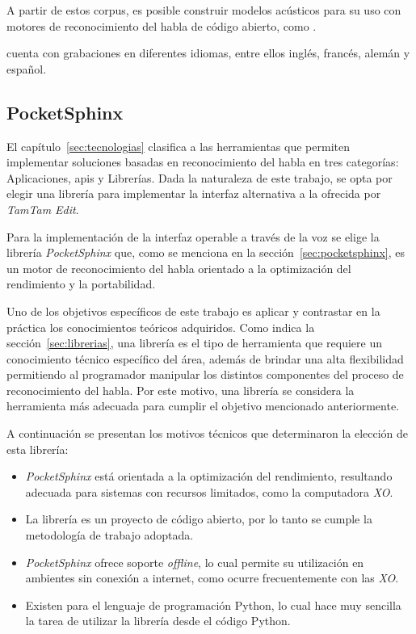 A partir de estos corpus, es posible construir modelos ac\'usticos para su uso con motores de 
reconocimiento del habla de c\'odigo abierto, como .

 cuenta con grabaciones en diferentes idiomas, entre ellos ingl\'es, franc\'es, 
alem\'an y espa\~nol.


\subsection{PocketSphinx}

El cap\'itulo~\ref{sec:tecnologias} clasifica a las herramientas que permiten implementar soluciones
basadas en reconocimiento del habla en tres categor\'ias: Aplicaciones, \gls{api}s y Librer\'ias. 
Dada la naturaleza de este trabajo, se opta por elegir una librer\'ia para implementar la interfaz
alternativa a la ofrecida por \emph{TamTam Edit}.

Para la implementaci\'on de la interfaz operable a trav\'es de la voz se elige la librer\'ia 
\emph{PocketSphinx} que, como se menciona en la secci\'on~\ref{sec:pocketsphinx}, es un motor de 
reconocimiento del habla orientado a la optimizaci\'on del rendimiento y la portabilidad.

Uno de los objetivos espec\'ificos de este trabajo es aplicar y contrastar en la pr\'actica
los conocimientos te\'oricos adquiridos. Como indica la secci\'on~\ref{sec:librerias}, una librer\'ia es
el tipo de herramienta que requiere un conocimiento t\'ecnico espec\'ifico del \'area, adem\'as de
brindar una alta flexibilidad permitiendo al programador manipular los distintos componentes del
proceso de reconocimiento del habla. Por este motivo, una librer\'ia se considera la herramienta 
m\'as adecuada para cumplir el objetivo mencionado anteriormente.

A continuaci\'on se presentan los motivos t\'ecnicos que determinaron la elecci\'on de esta librer\'ia:

\begin{itemize}
    \item \emph{PocketSphinx} est\'a orientada a la optimizaci\'on del rendimiento, resultando adecuada 
    para sistemas con recursos limitados, como la computadora \emph{XO}.
    \item La librer\'ia es un proyecto de c\'odigo abierto, por lo tanto se cumple la metodolog\'ia 
    de trabajo adoptada.
    \item \emph{PocketSphinx} ofrece soporte \emph{offline}, lo cual permite su utilizaci\'on en ambientes
    sin conexi\'on a internet, como ocurre frecuentemente con las \emph{XO}.
    \item Existen  para el lenguaje de programaci\'on Python, lo cual hace muy 
    sencilla la tarea de utilizar la librer\'ia desde el c\'odigo Python.
\end{itemize}

